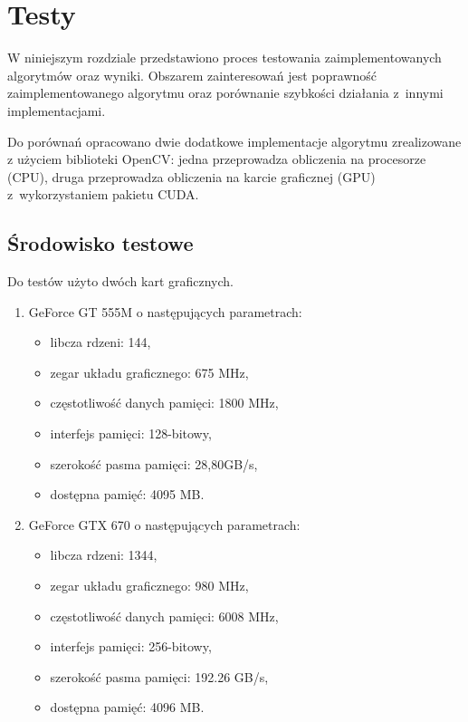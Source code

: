 \chapter{Testy}
\label{cha:testy}

W niniejszym rozdziale przedstawiono proces testowania zaimplementowanych algorytmów oraz wyniki. Obszarem zainteresowań jest poprawność zaimplementowanego algorytmu oraz porównanie szybkości działania z~innymi implementacjami.

Do porównań opracowano dwie dodatkowe implementacje algorytmu zrealizowane z użyciem biblioteki OpenCV: jedna przeprowadza obliczenia na procesorze (CPU), druga przeprowadza obliczenia na karcie graficznej (GPU) z~wykorzystaniem pakietu CUDA.

\section{Środowisko testowe}
\label{sec:srodowiskoTesty}

Do testów użyto dwóch kart graficznych.

\begin{enumerate}
\item GeForce GT 555M \cite{GT555M} o następujących parametrach:
\begin{itemize}
\item libcza rdzeni: 144,
\item zegar układu graficznego: 675 MHz,
\item częstotliwość danych pamięci: 1800 MHz,
\item interfejs pamięci: 128-bitowy,
\item szerokość pasma pamięci: 28,80GB/s,
\item dostępna pamięć: 4095 MB.
\end{itemize}

\item GeForce GTX 670 \cite{GTX670} o następujących parametrach:
\begin{itemize}
\item libcza rdzeni: 1344,
\item zegar układu graficznego: 980 MHz,
\item częstotliwość danych pamięci: 6008 MHz,
\item interfejs pamięci: 256-bitowy,
\item szerokość pasma pamięci: 192.26 GB/s,
\item dostępna pamięć: 4096 MB.
\end{itemize}
\end{enumerate}

